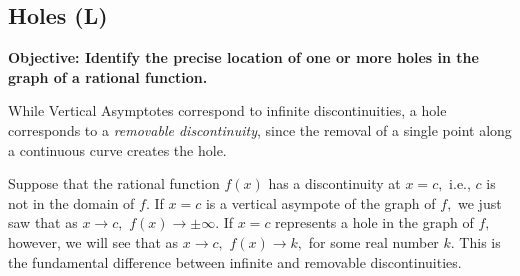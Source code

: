 \documentclass[12pt]{book}
\theoremstyle{definition}
\begin{document}
\subsection{Holes (L)}
{\bf Objective: Identify the precise location of one or more holes in the graph of a rational function.}\par
While Vertical Asymptotes correspond to infinite discontinuities, a hole corresponds to a {\it removable discontinuity}, since the removal of a single point along a continuous curve creates the hole.
\par
Suppose that the rational function $f(x)$ has a discontinuity at $x=c,$ i.e., $c$ is not in the domain of $f$.  If $x=c$ is a vertical asympote of the graph of $f,$ we just saw that as $x\rightarrow c,$ $f(x)\rightarrow\pm\infty$.  If $x=c$ represents a hole in the graph of $f,$ however, we will see that as $x\rightarrow c,$ $f(x)\rightarrow k,$ for some real number $k$.  This is the fundamental difference between infinite and removable discontinuities.
\end{document}
